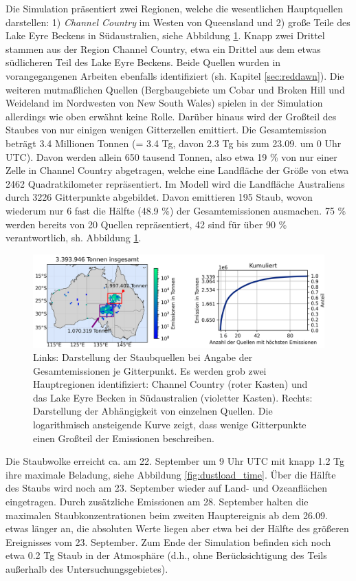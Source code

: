 \documentclass[12pt,a4paper,onecolumn]{scrartcl}
\begin{document}
Die Simulation präsentiert zwei Regionen, welche die wesentlichen Hauptquellen darstellen: 1) \textit{Channel Country} im Westen von Queensland und 2) große Teile des Lake Eyre Beckens in Südaustralien, siehe Abbildung \ref{fig:emissions}. Knapp zwei Drittel stammen aus der Region Channel Country, etwa ein Drittel aus dem etwas südlicheren Teil des Lake Eyre Beckens. Beide Quellen wurden in vorangegangenen Arbeiten ebenfalls identifiziert (sh. Kapitel \ref{sec:reddawn}). Die weiteren mutmaßlichen Quellen (Bergbaugebiete um Cobar und Broken Hill und Weideland im Nordwesten von New South Wales) spielen in der Simulation allerdings wie oben erwähnt keine Rolle. Darüber hinaus wird der Großteil des Staubes von nur einigen wenigen Gitterzellen emittiert. Die Gesamtemission beträgt 3.4 Millionen Tonnen (= 3.4 Tg, davon 2.3 Tg bis zum 23.09. um 0 Uhr UTC). Davon werden allein 650 tausend Tonnen, also etwa 19 \% von nur einer Zelle in Channel Country abgetragen, welche eine Landfläche der Größe von etwa 2462 Quadratkilometer repräsentiert. Im Modell wird die Landfläche Australiens durch 3226 Gitterpunkte abgebildet. Davon emittieren 195 Staub, wovon wiederum nur 6 fast die Hälfte (48.9 \%) der Gesamtemissionen ausmachen. 75 \% werden bereits von 20 Quellen repräsentiert, 42 sind für über 90 \% verantwortlich, sh. Abbildung \ref{fig:emissions}. 
\begin{figure}
\includegraphics[width=\textwidth]{bilder/emission_sections.png}
\caption{Links: Darstellung der Staubquellen bei Angabe der Gesamtemissionen je Gitterpunkt. Es werden grob zwei Hauptregionen identifiziert: Channel Country (roter Kasten) und das Lake Eyre Becken in Südaustralien (violetter Kasten). Rechts: Darstellung der Abhängigkeit von einzelnen Quellen. Die logarithmisch ansteigende Kurve zeigt, dass wenige Gitterpunkte einen Großteil der Emissionen beschreiben.} \label{fig:emissions}
\end{figure}
Die Staubwolke erreicht ca. am 22. September um 9 Uhr UTC mit knapp 1.2 Tg ihre maximale Beladung, siehe Abbildung \ref{fig:dustload_time}. Über die Hälfte des Staubs wird noch am 23. September wieder auf Land- und Ozeanflächen eingetragen. Durch zusätzliche Emissionen am 28. September halten die maximalen Staubkonzentrationen beim zweiten Hauptereignis ab dem 26.09. etwas länger an, die absoluten Werte liegen aber etwa bei der Hälfte des größeren Ereignisses vom 23. September. Zum Ende der Simulation befinden sich noch etwa 0.2 Tg Staub in der Atmosphäre (d.h., ohne Berücksichtigung des Teils außerhalb des Untersuchungsgebietes).
\end{document}
